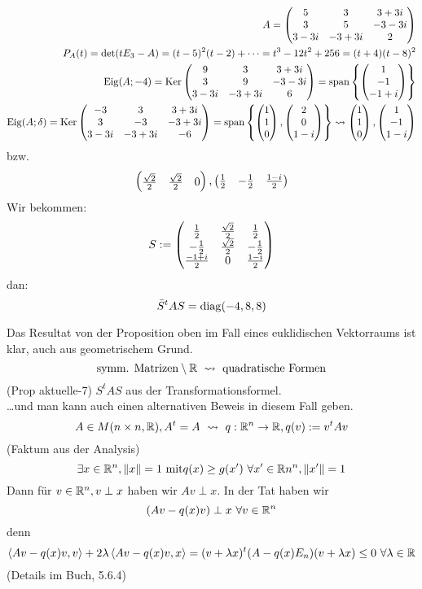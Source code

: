 \begin{Bsp}
  \begin{align*}
    A=\begin{pmatrix}5&3&3+3i\\3&5&-3-3i\\3-3i&-3+3i&2\end{pmatrix}\\
    P_A(t)=\det(tE_3-A)=(t-5)^2(t-2)+\cdots = t^3-12t^2+256=(t+4)(t-8)^2\\
    \operatorname{Eig}(A;-4)=\operatorname{Ker}\begin{pmatrix}9&3&3+3i\\3&9&-3-3i\\3-3i&-3+3i&6\end{pmatrix}=\operatorname{span} \left\{ \begin{pmatrix}1\\-1\\-1+i\end{pmatrix} \right\} \\
    \operatorname{Eig}(A;\delta)=\operatorname{Ker}\begin{pmatrix}-3&3&3+3i\\3&-3&-3+3i\\3-3i&-3+3i&-6\end{pmatrix}=\operatorname{span}\left\{ \begin{pmatrix}1\\1\\0\end{pmatrix} ,\begin{pmatrix}2\\0\\1-i\end{pmatrix} \right\} \rightsquigarrow \begin{pmatrix}1\\1\\0\end{pmatrix},\begin{pmatrix}1\\-1\\1-i\end{pmatrix}
  \end{align*}
  bzw.
  \[\begin{pmatrix}\frac{\sqrt{2}}{2}&\frac{\sqrt{2}}{2}&0\end{pmatrix},\begin{pmatrix}\frac{1}{2}&-\frac{1}{2}&\frac{1-i}{2}\end{pmatrix}\]
  Wir bekommen:
  \[S:=\begin{pmatrix}\frac{1}{2}&\frac{\sqrt{2}}{2}&\frac{1}{2}\\ -\frac{1}{2}&\frac{\sqrt{2}}{2}&-\frac{1}{2}\\ \frac{-1+i}{2}&0&\frac{1-i}{2}\end{pmatrix}\]
  dan:
  \[\bar S^tAS=\operatorname{diag}(-4,8,8)\]
\end{Bsp}
\begin{Bem}
  Das Resultat von der Proposition oben im Fall eines euklidischen Vektorraums ist klar, auch aus geometrischem Grund.
  \[\text{symm. Matrizen}\setminus \mb{R}\ \rsa\ \text{quadratische Formen}\]
  (Prop aktuelle-7) $S^tAS$ aus der Transformationsformel.\\
  \ldots und man kann auch einen alternativen Beweis in diesem Fall geben.
  \[A\in M(n\times n,\mb{R}), A^t=A\ \rsa\ q:\mb{R}^n\to\mb{R},q(v):=v^tAv\]
  (Faktum aus der Analysis)
  \[\exists x\in\mathbb{R}^n, \left\| x \right\|=1\ \text{mit} q(x)\geq g(x')\ \forall x'\in\mathbb{R}n^n, \left\| x' \right\|=1\]
  Dann für $v\in\mathbb{R}^n, v\perp x$ haben wir $Av\perp x$. In der Tat haben wir 
  \[(Av-q(x)v)\perp x\ \forall v\in\mb{R}^n\]
  denn
  \[\left\langle Av-q(x)v, v\right\rangle +2\lambda\left\langle Av-q(x)v,x \right\rangle =(v+\lambda x)^t(A-q(x)E_n)(v+\lambda x)\leq 0\ \forall \lambda\in\mathbb{R}\]
  (Details im Buch, 5.6.4)
\end{Bem}
